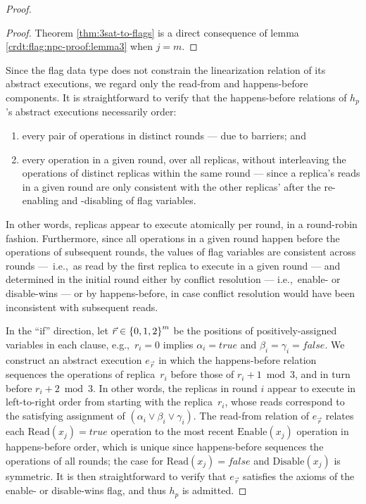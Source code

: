 \begin{proof}
  \begin{proof}
    Theorem \ref{thm:3sat-to-flags} is a direct consequence of lemma \ref{crdt:flag:npc-proof:lemma3} when $j = m$. 
  \end{proof}

  Since the flag data type does not constrain the linearization relation of its abstract executions, we regard only the read-from and happens-before components. It is straightforward to verify that the happens-before relations of $h_p$’s abstract executions necessarily order:
  \vspace{-1.5mm}
  \begin{enumerate}

    \item every pair of operations in distinct rounds — due to barriers; and

    \item every operation in a given round, over all replicas, without interleaving the operations of distinct replicas within the same round — since a replica’s reads in a given round are only consistent with the other replicas’ after the re-enabling and -disabling of flag variables.
\vspace{-1.5mm}
  \end{enumerate}

  In other words, replicas appear to execute atomically per round, in a round-robin fashion. Furthermore, since all operations in a given round happen before the operations of subsequent rounds, the values of flag variables are consistent across rounds — i.e.,~as read by the first replica to execute in a given round — and determined in the initial round either by conflict resolution — i.e.,~enable- or disable-wins — or by happens-before, in case conflict resolution would have been inconsistent with subsequent reads.

  In the “if” direction, let $\vec{r} \in {\{{0,1,2}\}}^m$ be the positions of positively-assigned variables in each clause, e.g.,~$r_i = 0$ implies $\alpha_i = \mathit{true}$ and $\beta_i = \gamma_i = \mathit{false}$. We construct an abstract execution $e_{\vec{r}}$ in which the happens-before relation sequences the operations of replica~$r_i$ before those of $r_i + 1 \bmod 3$, and in turn before $r_i + 2 \bmod 3$. In other words, the replicas in round $i$ appear to execute in left-to-right order from starting with the replica~$r_i$, whose reads correspond to the satisfying assignment of $(\alpha_i \lor \beta_i \lor \gamma_i)$. The read-from relation of $e_{\vec{r}}$ relates each $\mathrm{Read}(x_j) = \mathit{true}$ operation to the most recent $\mathrm{Enable}(x_j)$ operation in happens-before order, which is unique since happens-before sequences the operations of all rounds; the case for $\mathrm{Read}(x_j) = \mathit{false}$ and $\mathrm{Disable}(x_j)$ is symmetric. It is then straightforward to verify that $e_{\vec{r}}$ satisfies the axioms of the enable- or disable-wins flag, and thus $h_p$ is admitted.


\end{proof}
